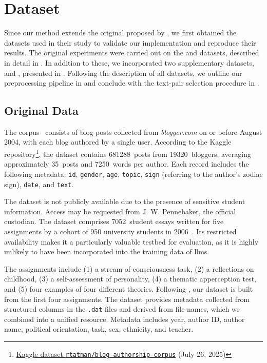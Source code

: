 \section{Dataset}
\label{sec:dataset}

Since our method extends the original \impAppr{} proposed by \citet{koppel_determining_2014}, we first obtained the datasets used in their study to validate our implementation and reproduce their results. 
The original experiments were carried out on the \dataBlog{} and \dataStudent{} datasets, described in detail in .
In addition to these, we incorporated two supplementary datasets, \dataPan{} and \dataGutenberg{}, presented in . 
Following the description of all datasets, we outline our preprocessing pipeline in  and conclude with the text-pair selection procedure in .


\subsection{Original Data}
\label{subsec:original_data}

The \dataBlog{} corpus~\citep{blog_dataset_2006} consists of blog posts collected from \textit{blogger.com} on or before August 2004, with each blog authored by a single user.
According to the Kaggle repository\footnote{\href{https://www.kaggle.com/datasets/rtatman/blog-authorship-corpus?resource=download}{Kaggle dataset \texttt{rtatman/blog-authorship-corpus}} (July 26, 2025)}, the dataset contains \num{681288}~posts from \num{19320}~bloggers, averaging approximately 35~posts and \num{7250}~words per author.
Each record includes the following metadata: \texttt{id}, \texttt{gender}, \texttt{age}, \texttt{topic}, 
\texttt{sign} (referring to the author's zodiac sign), \texttt{date}, and \texttt{text}.

The \dataStudent{} dataset is not publicly available due to the presence of sensitive student information. 
Access may be requested from J. W. Pennebaker, the official custodian.
The dataset comprises \num{7052}~student essays written for five assignments by a cohort of 950 university students in 2006~\citep{koppel_determining_2014}.
Its restricted availability makes it a particularly valuable testbed for evaluation, as it is highly unlikely to have been incorporated into the training data of \acp{llm}.

The \dataStudent{} assignments include (1) a stream-of-consciousness task, (2) a reflections on childhood, (3) a self-assessment of personality, (4) a thematic apperception test, and (5) four examples of four different theories.
Following \citet{koppel_determining_2014}, our dataset is built from the first four assignments. 
The dataset provides metadata collected from structured columns in the \texttt{.dat} files and derived from file names, which we combined into a unified resource. 
Metadata includes year, author ID, author name, political orientation, task, sex, ethnicity, and teacher.


